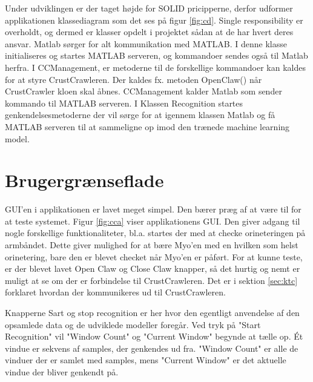 
Under udviklingen er der taget højde for SOLID pricipperne\citep{RefWorks:10}, derfor udformer applikationen klassediagram som det ses på figur \ref{fig:cd}. Single responsibility er overholdt, og dermed er klasser opdelt i projektet sådan at de har hvert deres ansvar. Matlab sørger for alt kommunikation med MATLAB. I denne klasse initialiseres og startes MATLAB serveren, og kommandoer sendes også til Matlab herfra. I CCManagement, er metoderne til de forskellige kommandoer kan kaldes for at styre CrustCrawleren. Der kaldes fx. metoden OpenClaw() når CrustCrawler kloen skal åbnes. CCManagement kalder Matlab som sender kommando til MATLAB serveren. I Klassen Recognition startes genkendelsesmetoderne der vil sørge for at igennem klassen Matlab og få MATLAB serveren til at sammeligne op imod den trænede machine learning model.



\section{Brugergrænseflade}

GUI'en i applikationen er lavet meget simpel. Den bærer præg af at være til for at teste systemet. Figur \ref{fig:cca} viser applikationens GUI. Den giver adgang til nogle forskellige funktionaliteter, bl.a. startes der med at checke orineteringen på armbåndet. Dette giver mulighed for at bære Myo'en med en hvilken som helst orinetering, bare den er blevet checket når Myo'en er påført. For at kunne teste, er der blevet lavet Open Claw og Close Claw knapper, så det hurtig og nemt er muligt at se om der er forbindelse til CrustCrawleren. Det er i sektion \ref{sec:ktc} forklaret hvordan der kommunikeres ud til CrustCrawleren.

Knapperne Sart og stop recognition er her hvor den egentligt anvendelse af den opsamlede data og de udviklede modeller foregår. Ved tryk på "Start Recognition" vil "Window Count" og "Current Window" begynde at tælle op. Ét vindue er sekvens af samples, der genkendes ud fra. "Window Count" er alle de vinduer der er samlet med samples, mens "Current Window" er det aktuelle vindue der bliver genkendt på.

